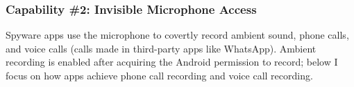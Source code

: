 

\subsubsection*{Capability \#2: Invisible Microphone Access}
\label{subsubsec:audio_recording}
Spyware apps use the microphone to covertly record
ambient sound, phone calls,
and voice calls (calls made in third-party apps like WhatsApp).
Ambient recording is enabled after acquiring the Android permission
to record; below I focus on how apps achieve phone call recording and voice call
recording.

